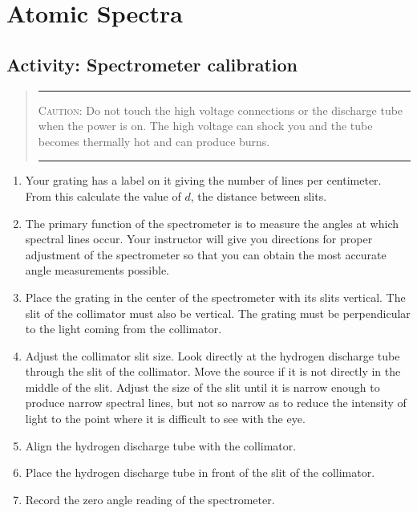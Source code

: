 \section{Atomic Spectra}

\subsection{Activity: Spectrometer calibration}
\begin{quote}\hrule
\textsc{Caution}:  Do not touch the high voltage connections or the discharge tube when the power is on.  The high voltage can shock you and the tube becomes thermally hot and can produce burns.\\[-0.5em]
\hrule
\end{quote}
\begin{enumerate}
	 \item 	Your grating has a label on it giving the number of lines per centimeter.  From this calculate the value of $d$, the distance between slits.
	 \item 	The primary function of the spectrometer is to measure the angles at which spectral lines occur.  Your instructor will give you directions for proper adjustment of the spectrometer so that you can obtain the most accurate angle measurements possible.
	 \item 	Place the grating in the center of the spectrometer with its slits vertical.  The slit of the collimator must also be vertical.  The grating must be perpendicular to the light coming from the collimator.
	\item Adjust the collimator slit size.  Look directly at the hydrogen discharge tube through the slit of the collimator.  Move the source if it is not directly in the middle of the slit.  Adjust the size of the slit until it is narrow enough to produce narrow spectral lines, but not so narrow as to reduce the intensity of light to the point where it is difficult to see with the eye.
	\item Align the hydrogen discharge tube with the collimator.
	
	\item Place the hydrogen discharge tube in front of the slit of the collimator.  
	
	\item Record the zero angle reading of the spectrometer.
	
\end{enumerate}

